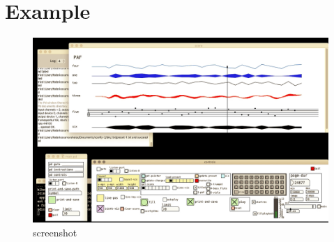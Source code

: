 \documentclass{article}
\begin{document}
\section{Example}


\begin{figure}[htbp]
\begin{center}
\includegraphics[width=\textwidth]{screenshot.png}
\caption{screenshot}
\label{fig:screenshot}
\end{center}
\end{figure}
\end{document}
